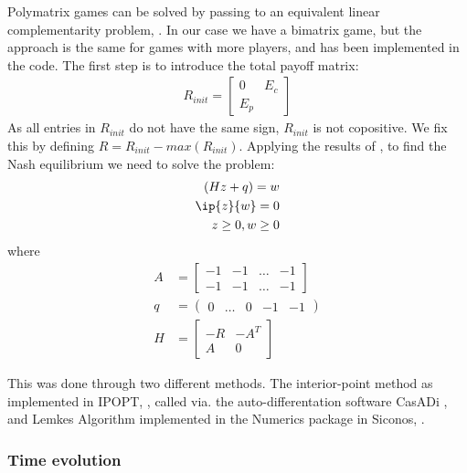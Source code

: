 Polymatrix games can be solved by passing to an equivalent linear complementarity problem,  \citep{miller1991copositive}. In our case we have a bimatrix game, but the approach is the same for games with more players, and has been implemented in the code. The first step is to introduce the total payoff matrix:
\begin{align}
	R_{init} = \begin{bmatrix} 0 & E_c \\ E_p \end{bmatrix}
\end{align}
As all entries in $R_{init}$ do not have the same sign, $R_{init}$ is not copositive. We fix this by defining $R=R_{init}-max(R_{init})$.
Applying the results of \citep{miller1991copositive}, to find the Nash equilibrium we need to solve the problem:
\begin{align}
	(Hz+q) = w & \\
	\ip{z}{w} = 0 & \\
	z\geq 0, w\geq 0
\end{align}
where
\begin{align}
	A &= \begin{bmatrix} -1 &-1 & \dots & -1 \\  -1 &-1 & \dots & -1 \end{bmatrix} \\
	q &= \begin{pmatrix} 0 &\dots & 0 & -1 & -1 \end{pmatrix}   \\
	H &= \begin{bmatrix} -R & -A^T \\ A & 0 \end{bmatrix}
\end{align}

This was done through two different methods. The interior-point method as implemented in IPOPT, \citep{wachter2006implementation}, called via. the auto-differentation software CasADi \citep{Andersson2019}, and Lemkes Algorithm implemented in the Numerics package in Siconos, \citep{acary2019introduction}.

\subsubsection*{Time evolution}


